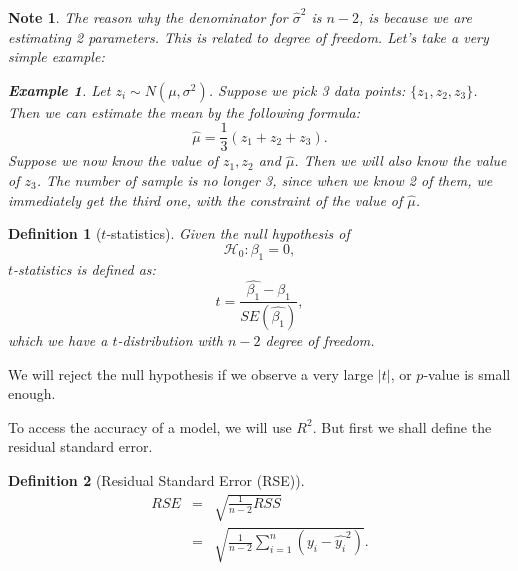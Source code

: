 \documentclass{article}
\theoremstyle{MyNonumberplain}
\theoremstyle{break}
\newcommand{\bt}[1]{\beta_{#1}}
\theoremstyle{break}
\newtheorem{example}{Example}[section]
\newtheorem{note}{Note}
\newtheorem{definition}{Definition}[section]
\begin{document}
\begin{notebox}
    \begin{note}
        The reason why the denominator for $\hat{\sigma}^2$ is $n-2$, is because we are estimating 2 parameters. This is related to degree of freedom.
        Let's take a very simple example:
        \begin{expbox}
            \begin{example}
                Let $z_i\sim N(\mu,\sigma^2)$. Suppose we pick 3 data points: $\{z_1,z_2,z_3\}$. Then we can estimate the mean by the following formula:
                $$\hat{\mu}=\frac{1}{3}(z_1+z_2+z_3).$$
                Suppose we now know the value of $z_1,z_2$ and $\hat\mu$. Then we will also know the value of $z_3$. The number of sample is no longer 3, since
                when we know 2 of them, we immediately get the third one, with the constraint of the value of $\hat\mu$.
            \end{example}
        \end{expbox}
    \end{note}
\end{notebox}

\begin{defbox}
    \begin{definition}[$t$-statistics]
        Given the null hypothesis of 
        $$\mathcal{H}_0:\bt{1}=0,$$
        $t$-statistics is defined as:
        $$t=\frac{\hat{\bt{1}}-{\bt{1}}}{SE(\hat{\bt{1}})},$$
        which we have a $t$-distribution with $n-2$ degree of freedom.

    \end{definition}
\end{defbox}

We will reject the null hypothesis if we observe a very large $|t|$, or $p$-value is small enough.

To access the accuracy of a model, we will use $R^2$. But first we shall define the residual standard error.

\begin{defbox}
    \begin{definition}[Residual Standard Error (RSE)]
        \begin{eqnarray*}
            RSE &=& \sqrt{\frac{1}{n-2}RSS}\\
                &=& \sqrt{\frac{1}{n-2}\sum_{i=1}^n (y_i-\hat{y_i}^2)} .
        \end{eqnarray*}
    \end{definition}
\end{defbox}
\end{document}
